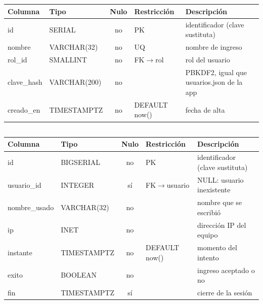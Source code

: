 \subsection*{}
\begin{longtable}{>{\ttfamily\raggedright}p{2.6cm} >{\ttfamily\raggedright}p{2.5cm} c >{\raggedright\footnotesize}p{3.6cm} >{\raggedright\arraybackslash}p{4.5cm}}
\toprule \textrm{\textbf{Columna}} & \textrm{\textbf{Tipo}} & \textbf{Nulo} & \textbf{Restricción} & \textbf{Descripción}\\ \midrule
id & SERIAL & no & PK & identificador (clave sustituta)\\
nombre & VARCHAR(32) & no & UQ & nombre de ingreso\\
rol\_id & SMALLINT & no & FK$\to$rol & rol del usuario\\
clave\_hash & VARCHAR(200) & no &  & PBKDF2, igual que usuarios.json de la app\\
creado\_en & TIMESTAMPTZ & no & DEFAULT now() & fecha de alta\\
\bottomrule \end{longtable}
\subsection*{}
\begin{longtable}{>{\ttfamily\raggedright}p{2.6cm} >{\ttfamily\raggedright}p{2.5cm} c >{\raggedright\footnotesize}p{3.6cm} >{\raggedright\arraybackslash}p{4.5cm}}
\toprule \textrm{\textbf{Columna}} & \textrm{\textbf{Tipo}} & \textbf{Nulo} & \textbf{Restricción} & \textbf{Descripción}\\ \midrule
id & BIGSERIAL & no & PK & identificador (clave sustituta)\\
usuario\_id & INTEGER & sí & FK$\to$usuario & NULL: usuario inexistente\\
nombre\_usado & VARCHAR(32) & no &  & nombre que se escribió\\
ip & INET & no &  & dirección IP del equipo\\
instante & TIMESTAMPTZ & no & DEFAULT now() & momento del intento\\
exito & BOOLEAN & no &  & ingreso aceptado o no\\
fin & TIMESTAMPTZ & sí &  & cierre de la sesión\\
\bottomrule \end{longtable}
